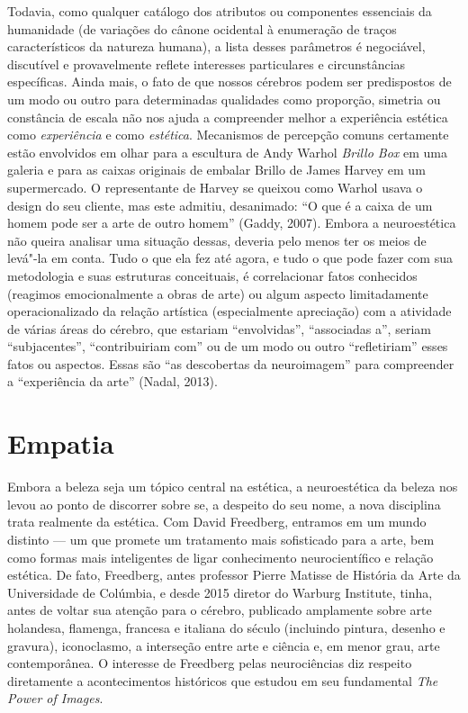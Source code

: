 Todavia, como qualquer catálogo dos atributos ou componentes essenciais
da humanidade (de variações do cânone ocidental à enumeração de traços
característicos da natureza humana), a lista desses parâmetros é
negociável, discutível e provavelmente reflete interesses particulares e
circunstâncias específicas. Ainda mais, o fato de que nossos cérebros
podem ser predispostos de um modo ou outro para determinadas qualidades
como proporção, simetria ou constância de escala não nos ajuda a
compreender melhor a experiência estética como \emph{experiência} e como
\emph{estética}. Mecanismos de percepção comuns certamente estão
envolvidos em olhar para a escultura de Andy Warhol \emph{Brillo Box} em
uma galeria e para as caixas originais de embalar Brillo de James Harvey
em um supermercado. O representante de Harvey se queixou como Warhol
usava o design do seu cliente, mas este admitiu, desanimado: ``O que é a
caixa de um homem pode ser a arte de outro homem'' (Gaddy, 2007). Embora
a neuroestética não queira analisar uma situação dessas, deveria pelo
menos ter os meios de levá"-la em conta. Tudo o que ela fez até agora, e
tudo o que pode fazer com sua metodologia e suas estruturas conceituais,
é correlacionar fatos conhecidos (reagimos emocionalmente a obras de
arte) ou algum aspecto limitadamente operacionalizado da relação
artística (especialmente apreciação) com a atividade de várias áreas do
cérebro, que estariam ``envolvidas'', ``associadas a'', seriam
``subjacentes'', ``contribuiriam com'' ou de um modo ou outro
``refletiriam'' esses fatos ou aspectos. Essas são ``as descobertas da
neuroimagem'' para compreender a ``experiência da arte'' (Nadal, 2013).

\chapter{Empatia}

Embora a beleza seja um tópico central na estética, a neuroestética da
beleza nos levou ao ponto de discorrer sobre se, a despeito do seu nome,
a nova disciplina trata realmente da estética. Com David Freedberg,
entramos em um mundo distinto --- um que promete um tratamento mais
sofisticado para a arte, bem como formas mais inteligentes de ligar
conhecimento neurocientífico e relação estética. De fato, Freedberg,
antes professor Pierre Matisse de História da Arte da Universidade de
Colúmbia, e desde 2015 diretor do Warburg Institute, tinha, antes de
voltar sua atenção para o cérebro, publicado amplamente sobre arte
holandesa, flamenga, francesa e italiana do século  (incluindo
pintura, desenho e gravura), iconoclasmo, a interseção entre arte e
ciência e, em menor grau, arte contemporânea. O interesse de Freedberg
pelas neurociências diz respeito diretamente a acontecimentos históricos
que estudou em seu fundamental \emph{The} \emph{Power of Images}.

